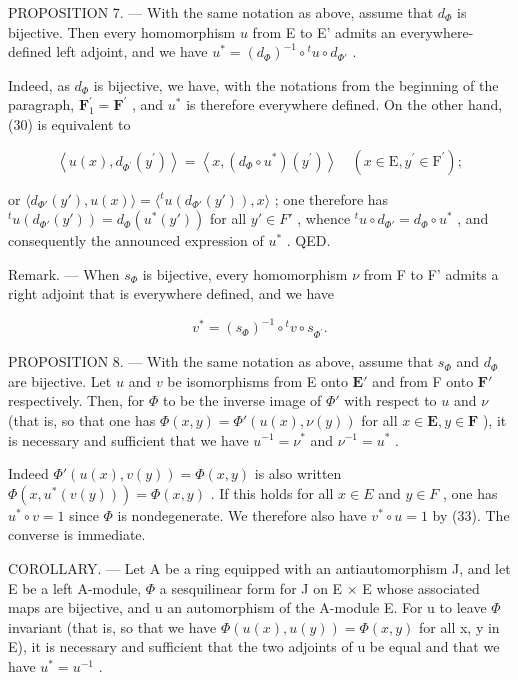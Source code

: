 PROPOSITION 7. --- With the same notation as above, assume that \(d_{\Phi}\) is bijective. Then every homomorphism \(u\) from E to E' admits an everywhere-defined left adjoint, and we have \(u^{*} = (d_{\Phi})^{-1} \circ {}^{t}u \circ d_{\Phi'}\) .

Indeed, as \(d_{\Phi}\) is bijective, we have, with the notations from the beginning of the paragraph, \(\mathbf{F}_{1}^{\prime}=\mathbf{F}^{\prime}\) , and \(u^{*}\) is therefore everywhere defined. On the other hand, (30) is equivalent to

\[
\left\langle u (x), d _ {\Phi^ {\prime}} \left(y ^ {\prime}\right) \right\rangle = \left\langle x, \left(d _ {\Phi} \circ u ^ {*}\right) \left(y ^ {\prime}\right) \right\rangle \quad \left(x \in \mathrm{E}, y ^ {\prime} \in \mathrm{F} ^ {\prime}\right);
\]

or \(\langle d_{\Phi'}(y'), u(x) \rangle = \langle {}^t u(d_{\Phi'}(y')), x \rangle\) ; one therefore has \({}^t u(d_{\Phi'}(y')) = d_{\Phi}(u^*(y'))\) for all \(y' \in F'\) , whence \({}^t u \circ d_{\Phi'} = d_{\Phi} \circ u^*\) , and consequently the announced expression of \(u^*\) . QED.

Remark. --- When \(s_{\Phi}\) is bijective, every homomorphism \(\nu\) from F to F' admits a right adjoint that is everywhere defined, and we have

\[
v ^ {*} = (s _ {\Phi}) ^ {- 1} \circ {} ^ {t} v \circ s _ {\Phi^ {\prime}}.\tag{34}
\]

PROPOSITION 8. --- With the same notation as above, assume that \(s_{\Phi}\) and \(d_{\Phi}\) are bijective. Let \(u\) and \(v\) be isomorphisms from E onto \(\mathbf{E}'\) and from F onto \(\mathbf{F}'\) respectively. Then, for \(\Phi\) to be the inverse image of \(\Phi'\) with respect to \(u\) and \(\nu\) (that is, so that one has \(\Phi(x,y)=\Phi'(u(x),\nu(y))\) for all \(x\in\mathbf{E},y\in\mathbf{F}\) ), it is necessary and sufficient that we have \(u^{-1}=\nu^{*}\) and \(\nu^{-1}=u^{*}\) .

Indeed \(\Phi'(u(x), v(y)) = \Phi(x, y)\) is also written \(\Phi(x, u^*(v(y))) = \Phi(x, y)\) . If this holds for all \(x \in E\) and \(y \in F\) , one has \(u^* \circ v = 1\) since \(\Phi\) is nondegenerate. We therefore also have \(v^* \circ u = 1\) by (33). The converse is immediate.

COROLLARY. --- Let A be a ring equipped with an antiautomorphism J, and let E be a left A-module, \(\Phi\) a sesquilinear form for J on E × E whose associated maps are bijective, and u an automorphism of the A-module E. For u to leave \(\Phi\) invariant (that is, so that we have \(\Phi(u(x), u(y)) = \Phi(x, y)\) for all x, y in E), it is necessary and sufficient that the two adjoints of u be equal and that we have \(u^{*} = u^{-1}\) .

